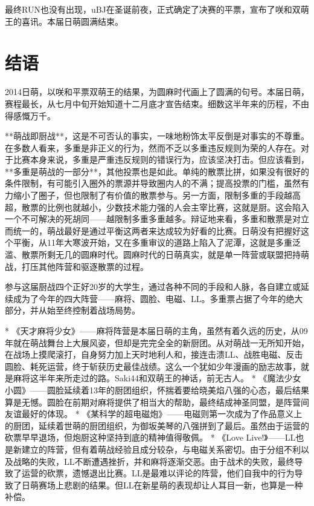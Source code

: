 最终RUN也没有出现，uBJ在圣诞前夜，正式确定了决赛的平票，宣布了咲和双萌王的喜讯。本届日萌圆满结束。

\section{结语}

2014日萌，以咲和平票双萌王的结果，为圆麻时代画上了圆满的句号。本届日萌，赛程最长，从七月中旬开始知道十二月底才宣告结束。细数这半年来的历程，不由得感慨万千。

**萌战即厨战**，这是不可否认的事实，一味地粉饰太平反倒是对事实的不尊重。在多数人看来，多重是非正义的行为，然而不乏以多重违反规则为荣的人存在。对于比赛本身来说，多重是严重违反规则的错误行为，应该坚决打击。但应该看到，**多重是萌战的一部分**，其他投票也是如此。单纯的散票比拼，如果没有很好的条件限制，有可能引入圈外的票源并导致圈内人的不满；提高投票的门槛，虽然有力缩小了圈子，但也限制了有价值的散票参与。另一方面，限制多重的手段越高超，散票的比例也就越小，少数技术能力强的人会主宰比赛，这就是厨。这会陷入一个不可解决的死胡同——越限制多重多重越多。辩证地来看，多重和散票是对立而统一的，萌战最好是通过平衡这两者来达成较为好看的比赛。日萌没有把握好这个平衡，从11年大寒波开始，又在多重审议的道路上陷入了泥潭，这就是多重泛滥、散票所剩无几的圆麻时代。圆麻时代的日萌真实，就是单一阵营或联盟把持萌战，打压其他阵营和驱逐散票的过程。

参与这届厨战四个正好20岁的大学生，通过各种不同的手段和人脉，各自建立或延续成为了今年的四大阵营——麻将、圆脸、电磁、LL。多重票占据了今年的绝大部分，并从始至终控制着战场局势。

* 《天才麻将少女》——麻将阵营是本届日萌的主角，虽然有着久远的历史，从09年就在萌战舞台上大展风姿，但却是完完全全的新厨团。从对萌战一无所知开始，在战场上摸爬滚打，自身努力加上天时地利人和，接连击溃LL、战胜电磁、反击圆脸、耗死运营，终于斩获历史最佳战绩。这么一个犹如少年漫画的励志故事，就是麻将这半年来所走过的路。Saki44和双萌王的神话，前无古人。
* 《魔法少女小圆》——圆脸延续着13年的厨团组织，怀揣着要给晓美焰八强的心态，最后结果算是无憾。圆脸在前期对麻将提供了相当大的帮助，最终结成神圣同盟，是阵营间友谊最好的体现。
* 《某科学的超电磁炮》——电磁则第一次成为了作品意义上的厨团，延续着世萌的厨团组织，为御坂美琴的八强拼到了最后。虽然由于运营的砍票早早退场，但炮厨这种坚持到底的精神值得敬佩。
* 《Love Live!》——LL也是新建立的阵营，但有着萌战经验且成分较杂，与电磁关系密切。由于分组不利以及战略的失败，LL不断遭遇挫折，并和麻将逐渐交恶。由于战术的失败，最终导致了运营的砍票，遗憾退出比赛。LL是最难以评论的阵营，他们自我中的行为导致了日萌赛场上悲剧的结果。但LL在新星萌的表现却让人耳目一新，也算是一种补偿。

